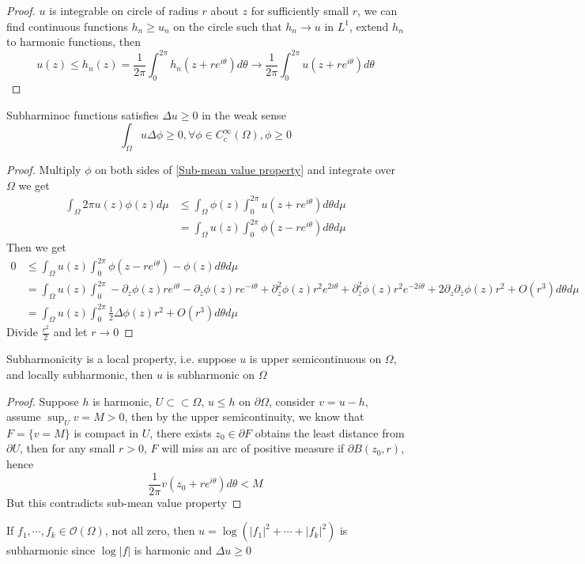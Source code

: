 \documentclass[../main.tex]{subfiles}
\begin{document}
\begin{proof}
$u$ is integrable on circle of radius $r$ about $z$ for sufficiently small $r$, we can find continuous functions $h_n\geq u_n$ on the circle such that $h_n\to u$ in $L^1$, extend $h_n$ to harmonic functions, then
\[u(z)\leq h_n(z)=\frac{1}{2\pi}\int_0^{2\pi}h_n(z+re^{i\theta})d\theta\to\frac{1}{2\pi}\int_0^{2\pi}u(z+re^{i\theta})d\theta\]
\end{proof}

\begin{proposition}
Subharminoc functions satisfies $\Delta u\geq0$ in the weak sense
\[\int_\Omega u\Delta\phi\geq0,\forall\phi\in C^\infty_c(\Omega),\phi\geq0\]
\end{proposition}

\begin{proof}
Multiply $\phi$ on both sides of \eqref{Sub-mean value property} and integrate over $\Omega$ we get
\begin{align*}
\int_\Omega 2\pi u(z)\phi(z)d\mu&\leq\int_\Omega\phi(z)\int_0^{2\pi}u(z+re^{i\theta})d\theta d\mu \\
&=\int_\Omega u(z)\int_0^{2\pi}\phi(z-re^{i\theta})d\theta d\mu
\end{align*}
Then we get
\begin{align*}
0&\leq\int_\Omega u(z)\int_0^{2\pi}\phi(z-re^{i\theta})-\phi(z)d\theta d\mu \\
&=\int_\Omega u(z)\int_0^{2\pi}-\partial_z\phi(z)re^{i\theta}-\partial_{\bar z}\phi(z)re^{-i\theta}+\partial^2_z\phi(z)r^2e^{2i\theta}+\partial^2_{\bar z}\phi(z)r^2e^{-2i\theta}+2\partial_z\partial_{\bar z}\phi(z)r^2+O(r^3)d\theta d\mu \\
&=\int_\Omega u(z)\int_0^{2\pi}\frac{1}{2}\Delta\phi(z)r^2+O(r^3)d\theta d\mu
\end{align*}
Divide $\frac{r^2}{2}$ and let $r\to 0$
\end{proof}

\begin{proposition}
Subharmonicity is a local property, i.e. suppose $u$ is upper semicontinuous on $\Omega$, and locally subharmonic, then $u$ is subharmonic on $\Omega$
\end{proposition}

\begin{proof}
Suppose $h$ is harmonic, $U\subset\subset\Omega$, $u\leq h$ on $\partial\Omega$, consider $v=u-h$, assume $\sup_Uv=M>0$, then by the upper semicontinuity, we know that $F=\{v=M\}$ is compact in $U$, there exists $z_0\in \partial F$ obtains the least distance from $\partial U$, then for any small $r>0$, $F$ will miss an arc of positive measure if $\partial B(z_0,r)$, hence
\[\frac{1}{2\pi}v(z_0+re^{i\theta})d\theta<M\]
But this contradicts sub-mean value property
\end{proof}

\begin{example}
If $f_1,\cdots,f_k\in \mathcal O(\Omega)$, not all zero, then $u=\log(|f_1|^2+\cdots+|f_k|^2)$ is subharmonic since $\log|f|$ is harmonic and $\Delta u\geq0$
\end{example}
\end{document}
